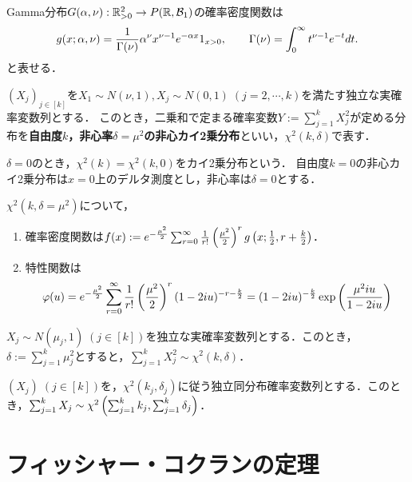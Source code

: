 \documentclass[uplatex,dvipdfmx]{jsreport}
\begin{document}
\begin{notation}
    Gamma分布$G(\alpha,\nu):\mathbb{R}_{>0}^2\to P(\mathbb{R},\mathcal{B}_1)$の確率密度関数は
    \[g(x;\alpha,\nu)=\frac{1}{\Gamma(\nu)}\alpha^\nu x^{\nu-1}e^{-\alpha x}1_{x>0},\qquad\Gamma(\nu)=\int^\infty_0t^{\nu-1}e^{-t}dt.\]
    と表せる．
\end{notation}

\begin{definition}
    $(X_j)_{j\in[k]}$を$X_1\sim N(\nu,1),X_j\sim N(0,1)\;(j=2,\cdots,k)$を満たす独立な実確率変数列とする．
    このとき，二乗和で定まる確率変数$Y:=\sum^k_{j=1}X^2_j$が定める分布を\textbf{自由度$k$，非心率$\delta=\mu^2$の非心カイ2乗分布}といい，$\chi^2(k,\delta)$で表す．
\end{definition}
\begin{remark}
    $\delta=0$のとき，$\chi^2(k)=\chi^2(k,0)$をカイ2乗分布という．
    自由度$k=0$の非心カイ2乗分布は$x=0$上のデルタ測度とし，非心率は$\delta=0$とする．
\end{remark}

\begin{proposition}
    $\chi^2(k,\delta=\mu^2)$について，
    \begin{enumerate}
        \item 確率密度関数は$f(x):=e^{-\frac{\mu^2}{2}}\sum^\infty_{r=0}\frac{1}{r!}\left(\frac{\mu^2}{2}\right)^rg\left(x;\frac{1}{2},r+\frac{k}{2}\right)$．
        \item 特性関数は
        \[\varphi(u)=e^{-\frac{\mu^2}{2}}\sum^\infty_{r=0}\frac{1}{r!}\left(\frac{\mu^2}{2}\right)^r(1-2iu)^{-r-\frac{k}{2}}=(1-2iu)^{-\frac{k}{2}}\exp\left(\frac{\mu^2iu}{1-2iu}\right)\]
    \end{enumerate}
\end{proposition}

\begin{corollary}
    $X_j\sim N(\mu_j,1)\;(j\in[k])$を独立な実確率変数列とする．このとき，$\delta:=\sum^k_{j=1}\mu^2_j$とすると，$\sum^k_{j=1}X^2_j\sim\chi^2(k,\delta)$．
\end{corollary}

\begin{corollary}
    $(X_j)\;(j\in[k])$を，$\chi^2(k_j,\delta_j)$に従う独立同分布確率変数列とする．このとき，$\sum^k_{j=1}X_j\sim\chi^2\left(\sum^k_{j=1}k_j,\sum^k_{j=1}\delta_j\right)$．
\end{corollary}

\section{フィッシャー・コクランの定理}
\end{document}
